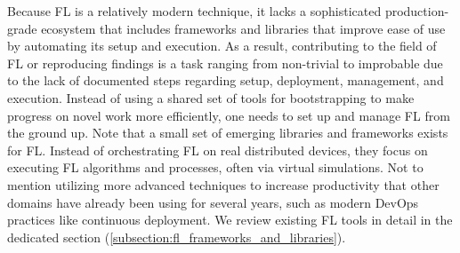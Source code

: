 Because FL is a relatively modern technique,
it lacks a sophisticated production-grade ecosystem that includes
frameworks and libraries that improve ease of use by automating its setup and execution.
As a result, contributing to the field of FL or reproducing findings is a task
ranging from non-trivial to improbable due to the lack of documented steps regarding setup,
deployment, management, and execution.
Instead of using a shared set of tools for bootstrapping to make progress on novel work more efficiently,
one needs to set up and manage FL from the ground up.
Note that a small set of emerging libraries and frameworks exists for FL.
Instead of orchestrating FL on real distributed devices,
they focus on executing FL algorithms and processes, often via virtual simulations. 
Not to mention utilizing more advanced techniques to increase productivity that
other domains have already been using for several years, such as modern DevOps practices like continuous deployment.
We review existing FL tools in detail in the dedicated section (\ref{subsection:fl_frameworks_and_libraries}).